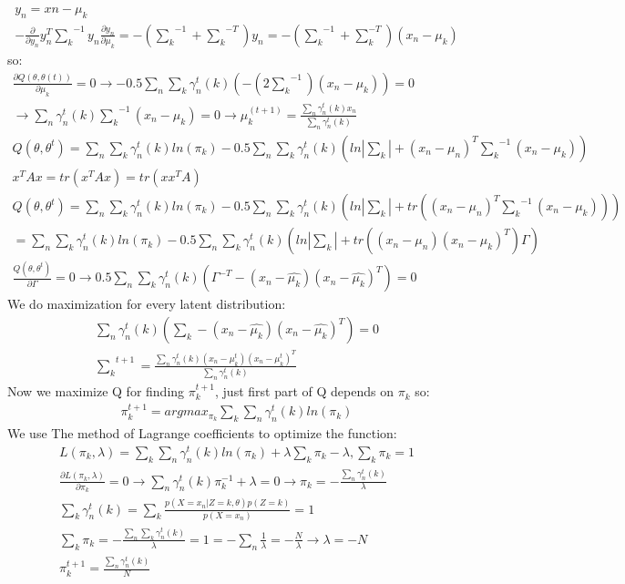 \documentclass[12pt]{article}
\begin{document}
\begin{qsolve}[solution]
\begin{gather*}
        y_n=xn-\mu_k \\
        -\frac{\partial}{\partial y_n}y_n^T{\sum_k}^{-1}y_n\frac{\partial y_n}{\partial\mu_k}=-({\sum_k}^{-1}+{\sum_k}^{-T})y_n=-({\sum_k}^{-1}+\sum_k^{-T})(x_n-\mu_k)
    \end{gather*}
    so:
    \begin{gather*}
        \frac{\partial Q(\theta,\theta(t))}{\partial \mu_k}=0\rightarrow-0.5\sum_n\sum_k\gamma_n^t(k)(-(2{\sum_k}^{-1})(x_n-\mu_k))=0 \\
        \rightarrow\sum_n\gamma_n^t(k){\sum_k}^{-1}(x_n-\mu_k)=0\rightarrow\mu_k^{(t+1)}=\frac{\sum_n\gamma_n^t(k)x_n}{\sum_n\gamma_n^t(k)} \\
        Q(\theta,\theta^t)=\sum_n\sum_k\gamma_n^t(k)ln(\pi_k) -0.5\sum_n\sum_k\gamma_n^t(k)(ln|\sum_k|+(x_n-\mu_n)^T{\sum_k}^{-1}(x_n-\mu_k))
    \end{gather*}
    \splitqsolve
    \begin{gather*}
        x^TAx=tr(x^TAx)=tr(xx^TA) \\
        Q(\theta,\theta^t)=\sum_n\sum_k\gamma_n^t(k)ln(\pi_k)- 0.5\sum_n\sum_{k}\gamma_n^t(k)(ln|\sum_k|+tr((x_n-\mu_n)^T{\sum_k}^{-1}(x_n-\mu_k))) \\
        =\sum_n\sum_k\gamma_n^t(k)ln(\pi_k)- 0.5\sum_n\sum_k\gamma_n^t(k)(ln|\sum_k|+tr((x_n-\mu_n)(x_n-\mu_k)^T)\Gamma) \\
        \frac{Q(\theta,\theta^t)}{\partial\Gamma}=0\rightarrow0.5\sum_n\sum_k\gamma_n^t(k)(\Gamma^{-T}-(x_n-\hat{\mu_k})(x_n-\hat{\mu_k})^T)=0
    \end{gather*}
    We do maximization for every latent distribution:
    \begin{gather*}
        \sum_n\gamma_n^t(k)(\sum_k-(x_n-\hat{\mu_k})(x_n-\hat{\mu_k})^T)=0\\
        {\sum_{k}}^{t+1}=\frac{\sum_n\gamma_n^t(k)(x_n-\mu_k^t)(x_n-\mu_k^t)^T}{\sum_n\gamma_n^t(k)}
    \end{gather*}
    Now we maximize Q for finding $\pi_k^{t+1}$, just first part of Q depends on $\pi_k$ so:
    \begin{align*}
        \pi_k^{t+1}=argmax_{\pi_k}\sum_k\sum_n\gamma_n^t(k)ln(\pi_k)
    \end{align*}
    We use The method of Lagrange coefficients to optimize the function:
    \begin{gather*}
        L(\pi_k,\lambda)=\sum_k\sum_n\gamma_n^t(k)ln(\pi_k)+\lambda\sum_k\pi_k-\lambda,\sum_k\pi_k=1\\
        \frac{\partial L(\pi_k,\lambda)}{\partial\pi_k}=0\rightarrow\sum_{n}\gamma_n^t(k)\pi_k^{-1}+\lambda=0\rightarrow \pi_k=-\frac{\sum_n\gamma_n^t(k)}{\lambda}\\
        \sum_k\gamma_n^t(k)=\sum_k\frac{p(X=x_n|Z=k,\theta)p(Z=k)}{p(X=x_n)}=1\\
        \sum_k\pi_k=-\frac{\sum_n\sum_k\gamma_n^t(k)}{\lambda}=1=-\sum_n\frac{1}{\lambda}=-\frac{N}{\lambda}\rightarrow\lambda=-N \\
        \pi_k^{t+1}=\frac{\sum_n\gamma_n^t(k)}{N}
    \end{gather*}
\end{qsolve}
\clearpage
\end{document}
